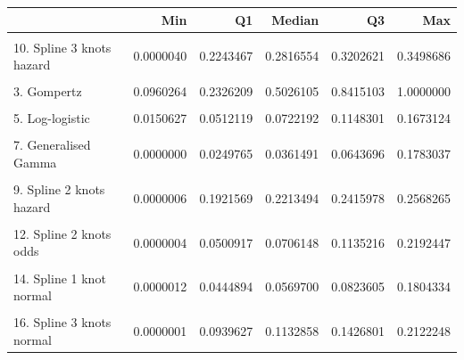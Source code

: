 \documentclass[
]{article}
\begin{document}
\begin{tabular}{lrrrrr}
\toprule
  & Min & Q1 & Median & Q3 & Max\\
\midrule
\cellcolor{gray!6}{1. Exponential} & \cellcolor{gray!6}{0.1278820} & \cellcolor{gray!6}{0.1278820} & \cellcolor{gray!6}{0.1278820} & \cellcolor{gray!6}{0.1278820} & \cellcolor{gray!6}{0.1278820}\\
10. Spline 3 knots hazard & 0.0000040 & 0.2243467 & 0.2816554 & 0.3202621 & 0.3498686\\
\cellcolor{gray!6}{2. Weibull} & \cellcolor{gray!6}{0.0298491} & \cellcolor{gray!6}{0.2382194} & \cellcolor{gray!6}{0.2998675} & \cellcolor{gray!6}{0.3413164} & \cellcolor{gray!6}{0.3730304}\\
3. Gompertz & 0.0960264 & 0.2326209 & 0.5026105 & 0.8415103 & 1.0000000\\
\cellcolor{gray!6}{4. Log-normal} & \cellcolor{gray!6}{0.0004751} & \cellcolor{gray!6}{0.0692201} & \cellcolor{gray!6}{0.0864990} & \cellcolor{gray!6}{0.1175437} & \cellcolor{gray!6}{0.1630482}\\
5. Log-logistic & 0.0150627 & 0.0512119 & 0.0722192 & 0.1148301 & 0.1673124\\
\cellcolor{gray!6}{6. Gamma} & \cellcolor{gray!6}{0.0159374} & \cellcolor{gray!6}{0.2105278} & \cellcolor{gray!6}{0.2273428} & \cellcolor{gray!6}{0.2338793} & \cellcolor{gray!6}{0.2373538}\\
7. Generalised Gamma & 0.0000000 & 0.0249765 & 0.0361491 & 0.0643696 & 0.1783037\\
\cellcolor{gray!6}{8. Spline 1 knot hazard} & \cellcolor{gray!6}{0.0005533} & \cellcolor{gray!6}{0.0961200} & \cellcolor{gray!6}{0.1007177} & \cellcolor{gray!6}{0.1087714} & \cellcolor{gray!6}{0.1767370}\\
9. Spline 2 knots hazard & 0.0000006 & 0.1921569 & 0.2213494 & 0.2415978 & 0.2568265\\
\cellcolor{gray!6}{11. Spline 1 knot odds} & \cellcolor{gray!6}{0.0004610} & \cellcolor{gray!6}{0.0331955} & \cellcolor{gray!6}{0.0461415} & \cellcolor{gray!6}{0.0743721} & \cellcolor{gray!6}{0.1809477}\\
12. Spline 2 knots odds & 0.0000004 & 0.0500917 & 0.0706148 & 0.1135216 & 0.2192447\\
\cellcolor{gray!6}{13. Spline 3 knots odds} & \cellcolor{gray!6}{0.0000052} & \cellcolor{gray!6}{0.0581364} & \cellcolor{gray!6}{0.0821832} & \cellcolor{gray!6}{0.1255993} & \cellcolor{gray!6}{0.2117141}\\
14. Spline 1 knot normal & 0.0000012 & 0.0444894 & 0.0569700 & 0.0823605 & 0.1804334\\
\cellcolor{gray!6}{15. Spline 2 knots normal} & \cellcolor{gray!6}{0.0000000} & \cellcolor{gray!6}{0.0682231} & \cellcolor{gray!6}{0.0852159} & \cellcolor{gray!6}{0.1164045} & \cellcolor{gray!6}{0.2005479}\\
16. Spline 3 knots normal & 0.0000001 & 0.0939627 & 0.1132858 & 0.1426801 & 0.2122248\\
\bottomrule
\end{tabular}
\end{document}
